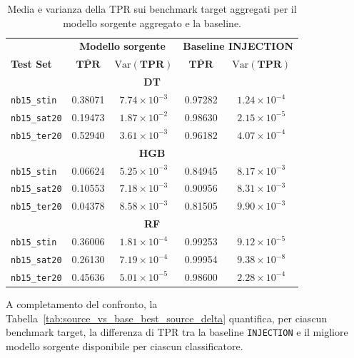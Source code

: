 \begin{table}[H]
    \centering
    \footnotesize
    \caption{Media e varianza della TPR sui benchmark target aggregati per il modello sorgente aggregato e la baseline.}
    \label{tab:source_vs_base_target_variance}
    \begin{tabular}{lcccc}
        \toprule
        & \multicolumn{2}{c}{\textbf{Modello sorgente}} & \multicolumn{2}{c}{\textbf{Baseline INJECTION}} \\
        \textbf{Test Set} & $\boldsymbol{\overline{TPR}}$ & $\boldsymbol{\mathrm{Var}(TPR)}$ & $\boldsymbol{\overline{TPR}}$ & $\boldsymbol{\mathrm{Var}(TPR)}$ \\
        \midrule
        \multicolumn{5}{c}{\textbf{DT}} \\
        \hline
        \texttt{nb15\_stin}  & 0.38071 & $7.74\times10^{-3}$ & 0.97282 & $1.24\times10^{-4}$ \\
        \texttt{nb15\_sat20} & 0.19473 & $1.87\times10^{-2}$ & 0.98630 & $2.15\times10^{-5}$ \\
        \texttt{nb15\_ter20} & 0.52940 & $3.61\times10^{-3}$ & 0.96182 & $4.07\times10^{-4}$ \\
        \hline
        \multicolumn{5}{c}{\textbf{HGB}} \\
        \hline
        \texttt{nb15\_stin}  & 0.06624 & $5.25\times10^{-3}$ & 0.84945 & $8.17\times10^{-3}$ \\
        \texttt{nb15\_sat20} & 0.10553 & $7.18\times10^{-3}$ & 0.90956 & $8.31\times10^{-3}$ \\
        \texttt{nb15\_ter20} & 0.04378 & $8.58\times10^{-3}$ & 0.81505 & $9.90\times10^{-3}$ \\
        \hline
        \multicolumn{5}{c}{\textbf{RF}} \\
        \hline
        \texttt{nb15\_stin}  & 0.36006 & $1.81\times10^{-4}$ & 0.99253 & $9.12\times10^{-5}$ \\
        \texttt{nb15\_sat20} & 0.26130 & $7.19\times10^{-4}$ & 0.99954 & $9.38\times10^{-8}$ \\
        \texttt{nb15\_ter20} & 0.45636 & $5.01\times10^{-5}$ & 0.98600 & $2.28\times10^{-4}$ \\
        \bottomrule
    \end{tabular}
\end{table}

A completamento del confronto, la Tabella~\ref{tab:source_vs_base_best_source_delta} quantifica, per ciascun benchmark target, la differenza di TPR tra la baseline \texttt{INJECTION} e il migliore modello sorgente disponibile per ciascun classificatore.

